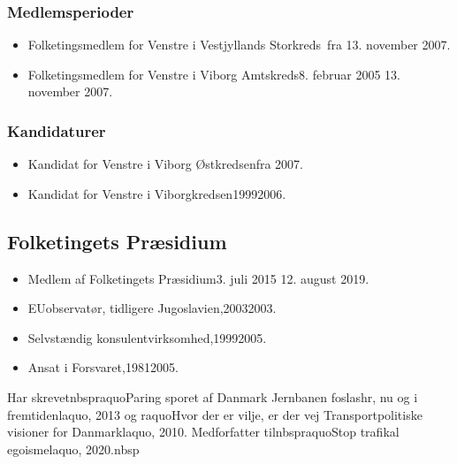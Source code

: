 \documentclass[11pt, a4paper]{awesome-cv}
\begin{document}
\begin{cvletter}
\subsubsection*{Medlemsperioder}
\begin{itemize}
\item Folketingsmedlem for Venstre i Vestjyllands Storkreds fra 13. november 2007.
\item Folketingsmedlem for Venstre i Viborg Amtskreds8. februar 2005  13. november 2007.
\end{itemize}
\subsubsection*{Kandidaturer}
\begin{itemize}
\item Kandidat for Venstre i Viborg Østkredsenfra 2007.
\item Kandidat for Venstre i Viborgkredsen19992006.
\end{itemize}
\subsection*{Folketingets Præsidium}
\begin{itemize}
\item Medlem af Folketingets Præsidium3. juli 2015  12. august 2019.
\end{itemize}
\begin{itemize}
\item EUobservatør, tidligere Jugoslavien,20032003.
\item Selvstændig konsulentvirksomhed,19992005.
\item Ansat i Forsvaret,19812005.
\end{itemize}
Har skrevetnbspraquoParing sporet af Danmark  Jernbanen foslashr, nu og i fremtidenlaquo, 2013 og raquoHvor der er vilje, er der vej  Transportpolitiske visioner for Danmarklaquo, 2010. Medforfatter tilnbspraquoStop trafikal egoismelaquo, 2020.nbsp

\end{cvletter}
\end{document}
